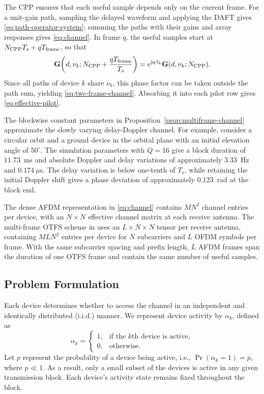 \begin{IEEEproof}
The CPP ensures that each useful sample depends only on the current
frame. For a unit-gain path, sampling the delayed waveform and applying
the DAFT gives \eqref{eq:path-operator-system}; summing the paths with
their gains and array responses gives \eqref{eq:channel}.
In frame $q$, the useful samples start at
$N_{\rm CPP}T_s+qT_{\rm frame}$, so that
\begin{equation*}
 \mathbf G\!\left(d,\nu_k;N_{\rm CPP}+\frac{qT_{\rm frame}}{T_s}\right)
 =e^{\mathrm jq\beta_k}\mathbf G(d,\nu_k;N_{\rm CPP}).
\end{equation*}
Since all paths of device $k$ share $\nu_k$, this phase factor can be
taken outside the path sum, yielding \eqref{eq:twc-frame-channel}.
Absorbing it into each pilot row gives \eqref{eq:effective-pilot}.
\end{IEEEproof}

The blockwise constant parameters in Proposition~\ref{prop:multiframe-channel}
approximate the slowly varying delay-Doppler channel.
For example, consider a circular orbit and
a ground device in the orbital plane with an initial elevation angle of
$50^\circ$. The simulation parameters with $Q=16$ give a block duration
of $11.73$~ms and absolute
Doppler and delay variations of approximately $3.33$~Hz and
$0.174~\mu$s. The delay variation is below one-tenth of $T_s$, while
retaining the initial Doppler shift gives a phase deviation of
approximately $0.123$~rad at the block end.

The dense AFDM representation in \eqref{eq:channel} contains $MN^2$
channel entries per device, with an $N\times N$ effective channel matrix
at each receive antenna. The multi-frame OTFS scheme in \cite{shen2025}
uses an $L\times N\times N$ tensor per receive antenna, containing
$MLN^2$ entries per device for $N$ subcarriers and $L$ OFDM symbols
per frame. With the same subcarrier spacing
and prefix length, $L$ AFDM frames span the duration of one OTFS
frame and contain the same number of useful samples.

\subsection{Problem Formulation}

Each device determines whether to access the channel in an independent
and identically distributed (i.i.d.) manner. We represent device activity
by $\alpha_k$, defined as
\[
 \alpha_k=\begin{cases}
 1,&\text{if the $k$th device is active},\\
 0,&\text{otherwise}.
 \end{cases}
\]
Let $p$ represent the probability of a device being active, i.e.,
$\Pr(\alpha_k=1)=p$, where $p\ll1$. As a result, only a small
subset of the devices is active in any given transmission block. Each
device's activity state remains fixed throughout the block.

